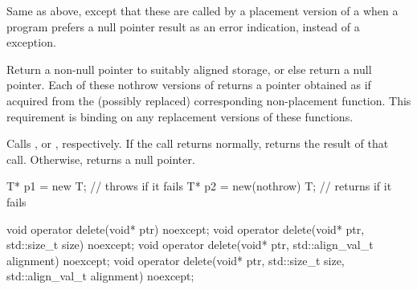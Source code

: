 \begin{itemdescr}
\pnum
\effects
Same as above, except that these are called by a placement version of a
when a \Cpp{} program prefers a null pointer result as an error indication,
instead of a
exception.

\pnum
\replaceable
{}

\pnum
\required
Return a non-null pointer to suitably aligned storage,
or else return a null pointer.
Each of these nothrow versions of
returns a pointer obtained as if
acquired from the (possibly replaced)
corresponding non-placement function.
This requirement is binding on any replacement versions of these functions.

\pnum
{}
Calls ,
or ,
respectively.
If the call returns normally,
returns the result of that call.
Otherwise, returns a null pointer.

\pnum
\begin{example}
\begin{codeblock}
T* p1 = new T;                  // throws  if it fails
T* p2 = new(nothrow) T;         // returns  if it fails
\end{codeblock}
\end{example}
\end{itemdescr}

%
\begin{itemdecl}
void operator delete(void* ptr) noexcept;
void operator delete(void* ptr, std::size_t size) noexcept;
void operator delete(void* ptr, std::align_val_t alignment) noexcept;
void operator delete(void* ptr, std::size_t size, std::align_val_t alignment) noexcept;
\end{itemdecl}


